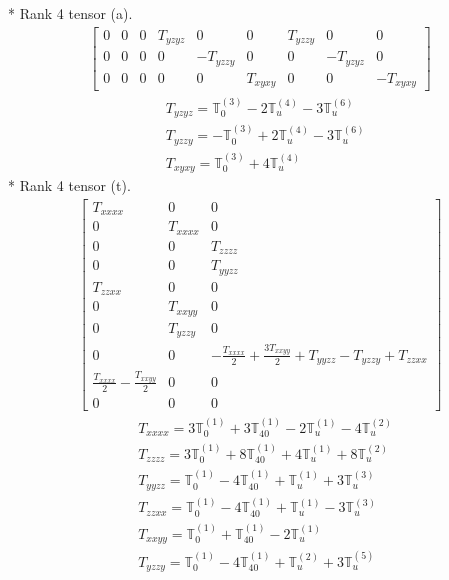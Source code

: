 \documentclass[fleqn,8pt,landscape]{jsarticle}
\begin{document}
* Rank 4 tensor (a).
\begin{align*}
\begin{bmatrix} 0 & 0 & 0 & T_{yzyz} & 0 & 0 & T_{yzzy} & 0 & 0 \\ 0 & 0 & 0 & 0 & - T_{yzzy} & 0 & 0 & - T_{yzyz} & 0 \\ 0 & 0 & 0 & 0 & 0 & T_{xyxy} & 0 & 0 & - T_{xyxy} \end{bmatrix}
\end{align*}
\begin{align*}
& T_{yzyz} = \mathbb{T}_{0}^{(3)} - 2 \mathbb{T}_{u}^{(4)} - 3 \mathbb{T}_{u}^{(6)} \\
& T_{yzzy} = - \mathbb{T}_{0}^{(3)} + 2 \mathbb{T}_{u}^{(4)} - 3 \mathbb{T}_{u}^{(6)} \\
& T_{xyxy} = \mathbb{T}_{0}^{(3)} + 4 \mathbb{T}_{u}^{(4)}
\end{align*}
* Rank 4 tensor (t).
\begin{align*}
\begin{bmatrix} T_{xxxx} & 0 & 0 \\ 0 & T_{xxxx} & 0 \\ 0 & 0 & T_{zzzz} \\ 0 & 0 & T_{yyzz} \\ T_{zzxx} & 0 & 0 \\ 0 & T_{xxyy} & 0 \\ 0 & T_{yzzy} & 0 \\ 0 & 0 & - \frac{T_{xxxx}}{2} + \frac{3 T_{xxyy}}{2} + T_{yyzz} - T_{yzzy} + T_{zzxx} \\ \frac{T_{xxxx}}{2} - \frac{T_{xxyy}}{2} & 0 & 0 \\ 0 & 0 & 0 \end{bmatrix}
\end{align*}
\begin{align*}
& T_{xxxx} = 3 \mathbb{T}_{0}^{(1)} + 3 \mathbb{T}_{40}^{(1)} - 2 \mathbb{T}_{u}^{(1)} - 4 \mathbb{T}_{u}^{(2)} \\
& T_{zzzz} = 3 \mathbb{T}_{0}^{(1)} + 8 \mathbb{T}_{40}^{(1)} + 4 \mathbb{T}_{u}^{(1)} + 8 \mathbb{T}_{u}^{(2)} \\
& T_{yyzz} = \mathbb{T}_{0}^{(1)} - 4 \mathbb{T}_{40}^{(1)} + \mathbb{T}_{u}^{(1)} + 3 \mathbb{T}_{u}^{(3)} \\
& T_{zzxx} = \mathbb{T}_{0}^{(1)} - 4 \mathbb{T}_{40}^{(1)} + \mathbb{T}_{u}^{(1)} - 3 \mathbb{T}_{u}^{(3)} \\
& T_{xxyy} = \mathbb{T}_{0}^{(1)} + \mathbb{T}_{40}^{(1)} - 2 \mathbb{T}_{u}^{(1)} \\
& T_{yzzy} = \mathbb{T}_{0}^{(1)} - 4 \mathbb{T}_{40}^{(1)} + \mathbb{T}_{u}^{(2)} + 3 \mathbb{T}_{u}^{(5)}
\end{align*}
\end{document}
